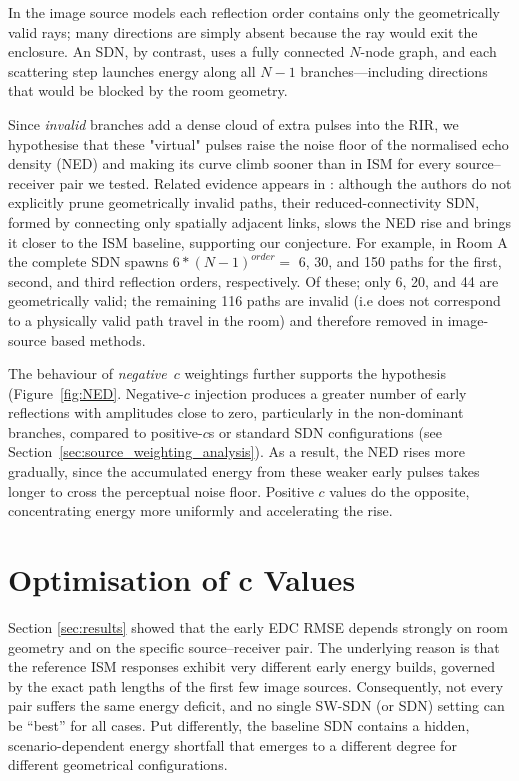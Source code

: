 \documentclass[journal]{IEEEtran}
\begin{document}
In the image source models each reflection order contains only the
geometrically valid rays; many directions are simply absent because the ray would exit the enclosure.    
An SDN, by contrast, uses a fully connected \(N\)-node graph, and each scattering step launches energy along all \(N-1\) branches—including directions that would be blocked by the room geometry.  

Since \emph{invalid} branches add a dense cloud of
extra pulses into the RIR, we hypothesise that these "virtual" pulses raise the noise floor of the normalised echo density
(NED) and making its curve climb sooner than in ISM for every
source–receiver pair we tested.  
Related evidence appears in \cite{scerbo2022ho_sdn}: although the authors do not explicitly prune
geometrically invalid paths, their reduced-connectivity SDN, formed by connecting only spatially adjacent links, slows the NED rise and brings it
closer to the ISM baseline, supporting our conjecture. For example, 
in Room A the complete SDN spawns $6*(N-1)^{order}=$ 6, 30, and 150 paths for the first, second, and third reflection orders, respectively. Of these; only 6, 20, and 44 are geometrically valid; the remaining 116 paths are invalid (i.e does not correspond to a physically valid path travel in the room) and therefore removed in image-source based methods. 

The behaviour of \emph{negative}~\(c\) weightings further supports the hypothesis (Figure~\ref{fig:NED}.  
Negative-$c$ injection produces a greater number of early reflections with amplitudes close to zero, particularly in the non-dominant branches, 
compared to positive-$c$s or standard SDN configurations (see Section~\ref{sec:source_weighting_analysis}).  
As a result, the NED rises more gradually, since the accumulated energy from these weaker early pulses takes longer to cross the perceptual noise floor. 
Positive \(c\) values do the opposite, concentrating energy more uniformly and accelerating the rise.  


\section{Optimisation of c Values}

Section \ref{sec:results} showed that the early EDC RMSE depends strongly on room geometry and on the specific source–receiver pair. 
The underlying reason is that the reference ISM responses exhibit very different early energy builds, 
governed by the exact path lengths of the first few image sources. 
Consequently, not every pair suffers the same energy deficit, and no single SW-SDN (or SDN) setting can be “best” for all cases. Put differently, 
the baseline SDN contains a hidden, scenario-dependent 
energy shortfall that emerges to a different degree for different geometrical configurations.
\end{document}
